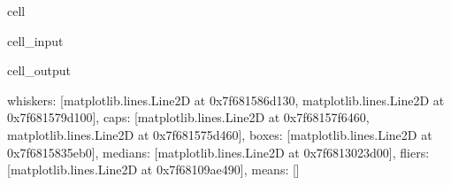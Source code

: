 \documentclass[letterpaper,10pt,english]{jupyterBook}
\begin{document}
\begin{sphinxuseclass}{cell}\begin{sphinxVerbatimInput}

\begin{sphinxuseclass}{cell_input}
\begin{sphinxVerbatim}[commandchars=\\\{\}]
 \PYG{p}{[} \PYG{p}{]}   
   
\PYG{p}{[}\PYG{p}{]} 
\end{sphinxVerbatim}

\end{sphinxuseclass}\end{sphinxVerbatimInput}
\begin{sphinxVerbatimOutput}

\begin{sphinxuseclass}{cell_output}
\begin{sphinxVerbatim}[commandchars=\\\{\}]
\PYGZob{}\PYGZsq{}whiskers\PYGZsq{}: [\PYGZlt{}matplotlib.lines.Line2D at 0x7f681586d130\PYGZgt{},
  \PYGZlt{}matplotlib.lines.Line2D at 0x7f681579d100\PYGZgt{}],
 \PYGZsq{}caps\PYGZsq{}: [\PYGZlt{}matplotlib.lines.Line2D at 0x7f68157f6460\PYGZgt{},
  \PYGZlt{}matplotlib.lines.Line2D at 0x7f681575d460\PYGZgt{}],
 \PYGZsq{}boxes\PYGZsq{}: [\PYGZlt{}matplotlib.lines.Line2D at 0x7f6815835eb0\PYGZgt{}],
 \PYGZsq{}medians\PYGZsq{}: [\PYGZlt{}matplotlib.lines.Line2D at 0x7f6813023d00\PYGZgt{}],
 \PYGZsq{}fliers\PYGZsq{}: [\PYGZlt{}matplotlib.lines.Line2D at 0x7f68109ae490\PYGZgt{}],
 \PYGZsq{}means\PYGZsq{}: []\PYGZcb{}
\end{sphinxVerbatim}

\noindent{}

\end{sphinxuseclass}\end{sphinxVerbatimOutput}

\end{sphinxuseclass}
\end{document}
